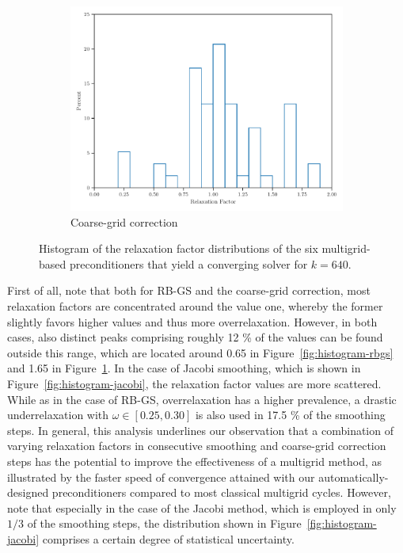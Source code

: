 \begin{figure}
\begin{subfigure}[b]{0.495\columnwidth}
    \includegraphics[width=\columnwidth]{figures/histogram_cgc.pdf}
	\caption{Coarse-grid correction}
	\label{fig:histogram-cgc}
\end{subfigure}
    \caption[2D Helmholtz -- Histogram of the relaxation factors]{Histogram of the relaxation factor distributions of the six multigrid-based preconditioners that yield a converging solver for $k = 640$.}
    \label{fig:histograms}
\end{figure}
First of all, note that both for RB-GS and the coarse-grid correction, most relaxation factors are concentrated around the value one, whereby the former slightly favors higher values and thus more overrelaxation.
However, in both cases, also distinct peaks comprising roughly 12 \% of the values can be found outside this range, which are located around 0.65 in Figure~\ref{fig:histogram-rbgs} and 1.65 in Figure~\ref{fig:histogram-cgc}.
In the case of Jacobi smoothing, which is shown in Figure~\ref{fig:histogram-jacobi}, the relaxation factor values are more scattered. 
While as in the case of RB-GS, overrelaxation has a higher prevalence, a drastic underrelaxation with $\omega \in \left[0.25, 0.30\right]$ is also used in 17.5 \% of the smoothing steps.
In general, this analysis underlines our observation that a combination of varying relaxation factors in consecutive smoothing and coarse-grid correction steps has the potential to improve the effectiveness of a multigrid method, as illustrated by the faster speed of convergence attained with our automatically-designed preconditioners compared to most classical multigrid cycles. 
However, note that especially in the case of the Jacobi method, which is employed in only $1/3$ of the smoothing steps, the distribution shown in Figure~\ref{fig:histogram-jacobi} comprises a certain degree of statistical uncertainty.

